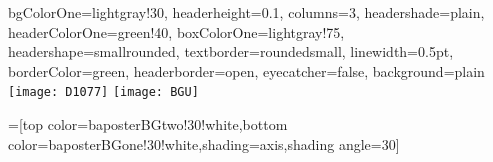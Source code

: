\documentclass[fleqn,portrait,final,a0paper]{baposter}
\begin{document}
\begin{poster}%
  {
  bgColorOne=lightgray!30,
  headerheight=0.1\textheight,
  columns=3,
  headershade=plain,
  headerColorOne=green!40,
  boxColorOne=lightgray!75,
  headershape=smallrounded,
  textborder=roundedsmall,
  linewidth=0.5pt,
  borderColor=green,
  headerborder=open,
  eyecatcher=false,
  background=plain
}
  {\texttt{[image: D1077]}} %
  {\bf \vspace{1em}}
  {\sf
  \vspace{-1.2em}  {}
  }
  {\hspace{1em}\texttt{[image: BGU]}\
  }

  =[top color=baposterBGtwo!30!white,bottom color=baposterBGone!30!white,shading=axis,shading angle=30]


\end{poster}
\end{document}
